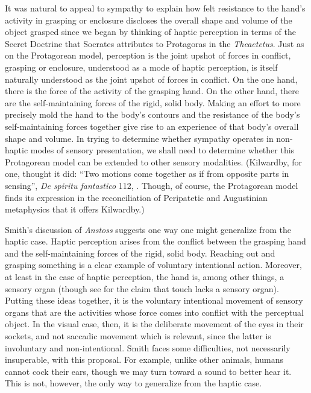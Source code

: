 It was natural to appeal to sympathy to explain how felt resistance to the hand's activity in grasping or enclosure discloses the overall shape and volume of the object grasped since we began by thinking of haptic perception in terms of the Secret Doctrine that Socrates attributes to Protagoras in the \emph{Theaetetus}. Just as on the Protagorean model, perception is the joint upshot of forces in conflict, grasping or enclosure, understood as a mode of haptic perception, is itself naturally understood as the joint upshot of forces in conflict. On the one hand, there is the force of the activity of the grasping hand. On the other hand, there are the self-maintaining forces of the rigid, solid body. Making an effort to more precisely mold the hand to the body's contours and the resistance of the body's self-maintaining forces together give rise to an experience of that body's overall shape and volume. In trying to determine whether sympathy operates in non-haptic modes of sensory presentation, we shall need to determine whether this Protagorean model can be extended to other sensory modalities. (Kilwardby, for one, thought it did: ``Two motions come together as if from opposite parts in sensing'', \emph{De spiritu fantastico} 112, \citealt[]{Broadie:1993dz}. Though, of course, the Protagorean model finds its expression in the reconciliation of Peripatetic and Augustinian metaphysics that it offers Kilwardby.)

Smith's \citeyearpar{Smith:2002sa} discussion of \emph{Anstoss} suggests one way one might generalize from the haptic case. Haptic perception arises from the conflict between the grasping hand and the self-maintaining forces of the rigid, solid body. Reaching out and grasping something is a clear example of voluntary intentional action. Moreover, at least in the case of haptic perception, the hand is, among other things, a sensory organ (though see \citealt{Paterson:2007aa} for the claim that touch lacks a sensory organ). Putting these ideas together, it is the voluntary intentional movement of sensory organs that are the activities whose force comes into conflict with the perceptual object. In the visual case, then, it is the deliberate movement of the eyes in their sockets, and not saccadic movement which is relevant, since the latter is involuntary and non-intentional. Smith faces some difficulties, not necessarily insuperable, with this proposal. For example, unlike other animals, humans cannot cock their ears, though we may turn toward a sound to better hear it. This is not, however, the only way to generalize from the haptic case. 

